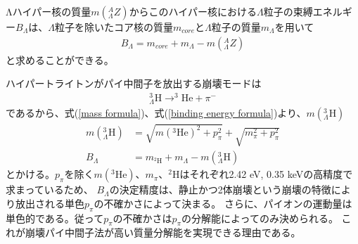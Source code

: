 \documentclass[a4paper,11pt,uplatex]{jsbook}
\begin{document}
Λハイパー核の質量$m(^A_\Lambda Z)$からこのハイパー核における$\Lambda$粒子の束縛エネルギー$B_\Lambda$は、$\Lambda$粒子を除いたコア核の質量$m_{core}$と$\Lambda$粒子の質量$m_\Lambda$を用いて
\begin{eqnarray}
  B_\Lambda = m_{core} + m_\Lambda - m(^A_\Lambda Z) \label{binding energy formula}
\end{eqnarray}
と求めることができる。

ハイパートライトンがパイ中間子を放出する崩壊モードは
\begin{eqnarray}
  ^3_{\Lambda}\text{H} \rightarrow ^3\text{He} + \pi^-
\end{eqnarray}
であるから、式(\ref{mass formula})、式(\ref{binding energy formula})より、$m(^3_\Lambda\text{H})$
\begin{eqnarray}
  m(^3_\Lambda \text{H}) &= \sqrt{m(^3\text{He})^2 + p^2_\pi} + \sqrt{m_\pi^2 + p_\pi^2} \\
  B_\Lambda &= m_{^2\text{H}} + m_\Lambda - m(^3_\Lambda \text{H})
\end{eqnarray}
とかける。$p_\pi$を除く$m(^3\text{He})$、$m_\pi$、$^2\text{H}$はそれぞれ2.42 eV\cite{Audi}, 0.35 keV\cite{Beringer}の高精度で求まっているため、
$B_\Lambda$の決定精度は、静止かつ2体崩壊という崩壊の特徴により放出される単色$p_\pi$の不確かさによって決まる。
さらに、パイオンの運動量は単色的である。従って$p_\pi$の不確かさは$p_\pi$の分解能によってのみ決められる。
これが崩壊パイ中間子法が高い質量分解能を実現できる理由である。
\end{document}
